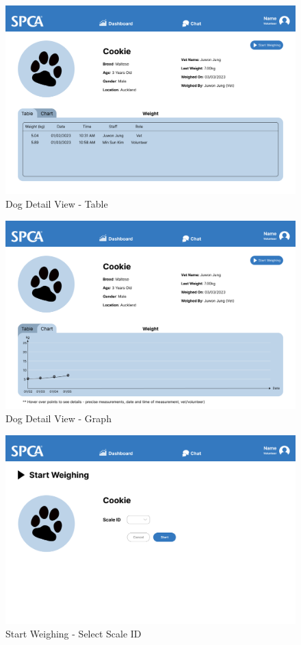 \begin{figure}[h]
\centering
\includegraphics[width=\textwidth]{proposal/parts/dashboard-dog-detail-table.png}
\caption{Dog Detail View - Table}
\label{figure:dog detail table}
\end{figure}

\begin{figure}[h]
\centering
\includegraphics[width=\textwidth]{proposal/parts/dashboard-dog-detail-graph.png}
\caption{Dog Detail View - Graph}
\label{figure:dog detail graph}
\end{figure}

\begin{figure}[h]
\centering
\includegraphics[width=\textwidth]{proposal/parts/add-data-1.png}
\caption{Start Weighing - Select Scale ID}
\label{figure:add data 1}
\end{figure}

